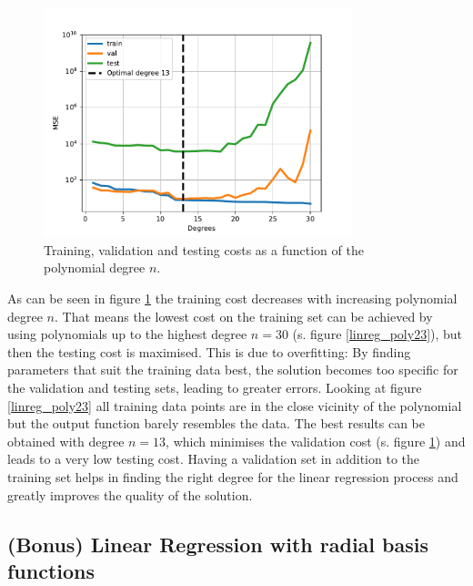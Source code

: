 \documentclass{article}
\begin{document}
\begin{figure}[!ht]
\centering
\includegraphics[width=0.8\textwidth]{./Figures/linreg_poly4_errors.pdf}
\caption{Training, validation and testing costs as a function of the polynomial degree $n$.}
\label{linreg_poly4}
\end{figure}

As can be seen in figure \ref{linreg_poly4} the training cost decreases with increasing polynomial degree $n$. That means the lowest cost on the training set can be achieved by using polynomials up to the highest degree $n=30$ (s. figure \ref{linreg_poly23}), but then the testing cost is maximised. This is due to overfitting: By finding parameters that suit the training data best, the solution becomes too specific for the validation and testing sets, leading to greater errors. Looking at figure \ref{linreg_poly23} all training data points are in the close vicinity of the polynomial but the output function barely resembles the data. The best results can be obtained with degree $n=13$, which minimises the validation cost (s. figure \ref{linreg_poly4}) and leads to a very low testing cost. Having a validation set in addition to the training set helps in finding the right degree for the linear regression process and greatly improves the quality of the solution.

\newpage


\subsection{(Bonus) Linear Regression with radial basis functions}
\end{document}
